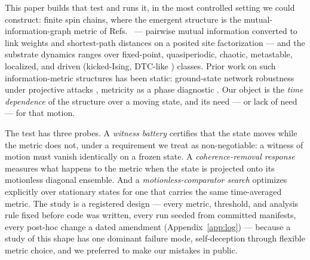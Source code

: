 \documentclass[a4paper,11pt,noarxiv]{quantumarticle}
\begin{document}
This paper builds that test and runs it, in the most controlled setting
we could construct: finite spin chains, where the emergent structure is
the mutual-information-graph metric of
Refs.~\cite{SRC049,SRC060,SRC061} --- pairwise mutual information
converted to link weights and shortest-path distances on a posited site
factorization --- and the substrate dynamics ranges over fixed-point,
quasiperiodic, chaotic, metastable, localized, and driven
(kicked-Ising, DTC-like \cite{SRC043,SRC044,SRC054}) classes. Prior work on
such information-metric structures has been static: ground-state
network robustness under projective attacks \cite{SRC060}, metricity as
a phase diagnostic \cite{SRC061}. Our object is the \emph{time
dependence} of the structure over a moving state, and its need --- or
lack of need --- for that motion.

The test has three probes. A \emph{witness battery} certifies that the
state moves while the metric does not, under a requirement we treat as
non-negotiable: a witness of motion must vanish identically on a frozen
state. A \emph{coherence-removal response} measures what happens to the
metric when the state is projected onto its motionless diagonal
ensemble. And a \emph{motionless-comparator search} optimizes
explicitly over stationary states for one that carries the same
time-averaged metric. The study is a registered design --- every
metric, threshold, and analysis rule fixed before code was written,
every run seeded from committed manifests, every post-hoc change a
dated amendment (Appendix~\ref{app:log}) --- because a study of this
shape has one dominant failure mode, self-deception through flexible
metric choice, and we preferred to make our mistakes in public.
\end{document}
